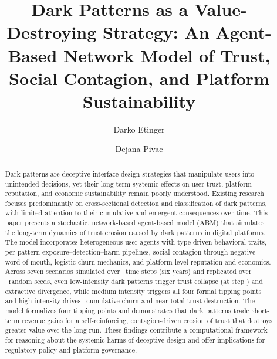 \documentclass[a4paper,fleqn]{cas-sc}
\begin{document}

\title[mode=title]{Dark Patterns as a Value-Destroying Strategy: An Agent-Based Network Model of Trust, Social Contagion, and Platform Sustainability}

\author[1]{Darko Etinger}
\cormark[1]
\fnmark[1]

\author[1]{Dejana Pivac}
\fnmark[1]



\begin{abstract}
Dark patterns are deceptive interface design strategies that manipulate users into unintended decisions, yet their long-term systemic effects on user trust, platform reputation, and economic sustainability remain poorly understood. Existing research focuses predominantly on cross-sectional detection and classification of dark patterns, with limited attention to their cumulative and emergent consequences over time. This paper presents a stochastic, network-based agent-based model (ABM) that simulates the long-term dynamics of trust erosion caused by dark patterns in digital platforms. The model incorporates heterogeneous user agents with type-driven behavioral traits, per-pattern exposure--detection--harm pipelines, social contagion through negative word-of-mouth, logistic churn mechanics, and platform-level reputation and economics. Across seven scenarios simulated over \maxSteps\ time steps (six years) and replicated over \numReplicates\ random seeds, even low-intensity dark patterns trigger trust collapse (at step \lowCollapseStep) and extractive divergence, while medium intensity triggers all four formal tipping points and high intensity drives \highChurn\ cumulative churn and near-total trust destruction. The model formalizes four tipping points and demonstrates that dark patterns trade short-term revenue gains for a self-reinforcing, contagion-driven erosion of trust that destroys greater value over the long run. These findings contribute a computational framework for reasoning about the systemic harms of deceptive design and offer implications for regulatory policy and platform governance.
\end{abstract}
\end{document}
